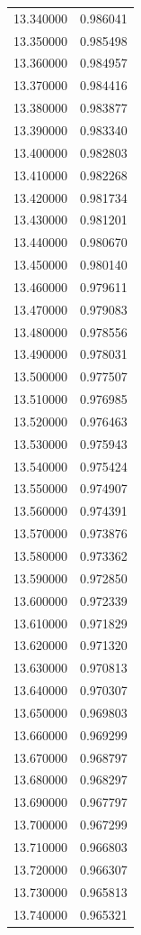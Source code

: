 \begin{tabular}{rr}
13.340000 & 0.986041 \\
13.350000 & 0.985498 \\
13.360000 & 0.984957 \\
13.370000 & 0.984416 \\
13.380000 & 0.983877 \\
13.390000 & 0.983340 \\
13.400000 & 0.982803 \\
13.410000 & 0.982268 \\
13.420000 & 0.981734 \\
13.430000 & 0.981201 \\
13.440000 & 0.980670 \\
13.450000 & 0.980140 \\
13.460000 & 0.979611 \\
13.470000 & 0.979083 \\
13.480000 & 0.978556 \\
13.490000 & 0.978031 \\
13.500000 & 0.977507 \\
13.510000 & 0.976985 \\
13.520000 & 0.976463 \\
13.530000 & 0.975943 \\
13.540000 & 0.975424 \\
13.550000 & 0.974907 \\
13.560000 & 0.974391 \\
13.570000 & 0.973876 \\
13.580000 & 0.973362 \\
13.590000 & 0.972850 \\
13.600000 & 0.972339 \\
13.610000 & 0.971829 \\
13.620000 & 0.971320 \\
13.630000 & 0.970813 \\
13.640000 & 0.970307 \\
13.650000 & 0.969803 \\
13.660000 & 0.969299 \\
13.670000 & 0.968797 \\
13.680000 & 0.968297 \\
13.690000 & 0.967797 \\
13.700000 & 0.967299 \\
13.710000 & 0.966803 \\
13.720000 & 0.966307 \\
13.730000 & 0.965813 \\
13.740000 & 0.965321 \\

\end{tabular}
